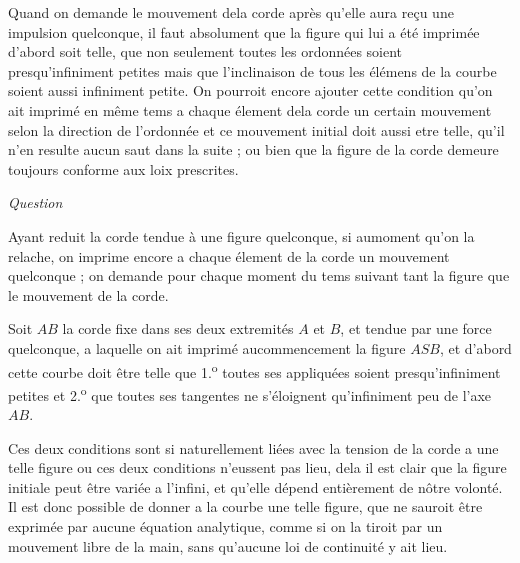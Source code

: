 \documentclass[11pt,a4paper]{article}
\begin{document}
Quand on demande le mouvement dela corde après qu'elle aura reçu
une impulsion quelconque, il faut absolument que la figure qui lui a été
imprimée d'abord soit telle, que non seulement toutes les ordonnées soient
presqu'infiniment petites mais que l'inclinaison de tous les élémens
de la courbe soient aussi infiniment petite. On pourroit encore ajouter
cette condition qu'on ait imprimé en même tems a chaque élement dela
corde un certain mouvement selon la direction de l'ordonnée et ce
mouvement initial doit aussi etre telle, qu'il n'en resulte aucun
saut dans la suite ; ou bien que la figure de la corde demeure
toujours conforme aux loix prescrites.

\emph{Question}

Ayant reduit la corde tendue à une figure quelconque, si aumoment
qu'on la relache, on imprime encore a chaque élement de la corde un
mouvement quelconque ; on demande pour chaque moment du tems suivant
tant la figure que le mouvement de la corde.

Soit $AB$ la corde fixe dans ses deux extremités $A$ et $B$, et tendue par une
force quelconque, a laquelle on ait imprimé aucommencement la figure
$ASB$, et d'abord cette courbe doit
être telle que 1.\textsuperscript{o} toutes ses appliquées
soient presqu'infiniment petites et 2.\textsuperscript{o}
que toutes ses tangentes ne s'éloignent
qu'infiniment peu de l'axe $AB$.

Ces deux conditions sont si naturellement liées avec la tension de la
corde a une telle figure ou ces deux conditions n'eussent pas lieu, dela
il est clair que la figure initiale peut être variée a l'infini, et qu'elle
dépend entièrement de nôtre volonté. Il est donc possible de donner
a la courbe une telle figure, que ne sauroit être exprimée par aucune
équation analytique, comme si on la tiroit par un mouvement libre
de la main, sans qu'aucune loi de continuité y ait lieu.
\end{document}
